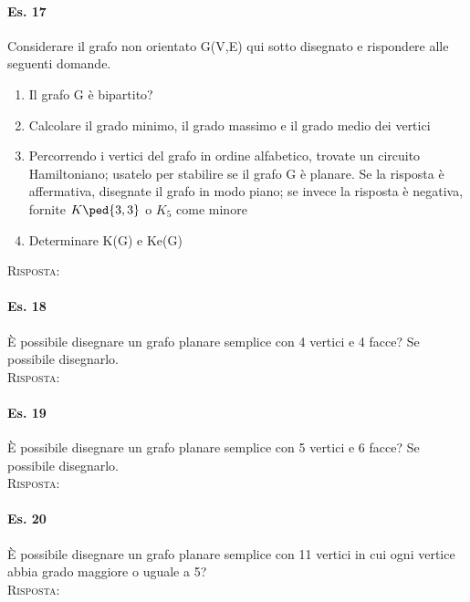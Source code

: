 \paragraph{Es. 17} Considerare il grafo non orientato G(V,E) qui sotto disegnato e rispondere alle seguenti domande.
\begin{enumerate}
    \item Il grafo G è bipartito?
    \item Calcolare il grado minimo, il grado massimo e il grado medio dei vertici
    \item Percorrendo i vertici del grafo in ordine alfabetico, trovate un circuito Hamiltoniano; usatelo per
stabilire se il grafo G è planare. Se la risposta è affermativa, disegnate il grafo in modo piano; se
invece la risposta è negativa, fornite $K\ped{3,3}$ o $K_5$ come minore
    \item Determinare K(G) e Ke(G)
\end{enumerate}
\textsc{Risposta:} 

\paragraph{Es. 18} È possibile disegnare un grafo planare semplice con 4 vertici e 4 facce?
Se possibile disegnarlo.\\

\noindent
\textsc{Risposta:}

\paragraph{Es. 19} È possibile disegnare un grafo planare semplice con 5 vertici e 6 facce?
Se possibile disegnarlo.\\

\noindent
\textsc{Risposta:}

\paragraph{Es. 20} È possibile disegnare un grafo planare semplice con 11 vertici in cui ogni vertice abbia grado
maggiore o uguale a 5? \\

\noindent
\textsc{Risposta:}


\newpage